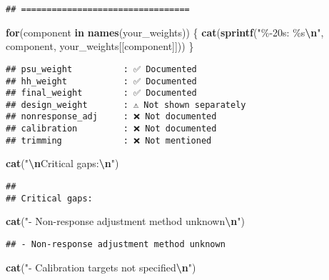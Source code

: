 \documentclass[
]{article}
\newenvironment{Shaded}{\begin{snugshade}}{\end{snugshade}}
\newcommand{\ControlFlowTok}[1]{\textcolor[rgb]{0.13,0.29,0.53}{\textbf{#1}}}
\newcommand{\FunctionTok}[1]{\textcolor[rgb]{0.13,0.29,0.53}{\textbf{#1}}}
\newcommand{\NormalTok}[1]{#1}
\newcommand{\SpecialCharTok}[1]{\textcolor[rgb]{0.81,0.36,0.00}{\textbf{#1}}}
\newcommand{\StringTok}[1]{\textcolor[rgb]{0.31,0.60,0.02}{#1}}
\begin{document}
\begin{verbatim}
## =================================
\end{verbatim}

\begin{Shaded}
\begin{Highlighting}[]
\ControlFlowTok{for}\NormalTok{(component }\ControlFlowTok{in} \FunctionTok{names}\NormalTok{(your\_weights)) \{}
  \FunctionTok{cat}\NormalTok{(}\FunctionTok{sprintf}\NormalTok{(}\StringTok{"\%{-}20s: \%s}\SpecialCharTok{\textbackslash{}n}\StringTok{"}\NormalTok{, component, your\_weights[[component]]))}
\NormalTok{\}}
\end{Highlighting}
\end{Shaded}

\begin{verbatim}
## psu_weight          : ✅ Documented
## hh_weight           : ✅ Documented
## final_weight        : ✅ Documented
## design_weight       : ⚠️ Not shown separately
## nonresponse_adj     : ❌ Not documented
## calibration         : ❌ Not documented
## trimming            : ❌ Not mentioned
\end{verbatim}

\begin{Shaded}
\begin{Highlighting}[]
\FunctionTok{cat}\NormalTok{(}\StringTok{"}\SpecialCharTok{\textbackslash{}n}\StringTok{Critical gaps:}\SpecialCharTok{\textbackslash{}n}\StringTok{"}\NormalTok{)}
\end{Highlighting}
\end{Shaded}

\begin{verbatim}
## 
## Critical gaps:
\end{verbatim}

\begin{Shaded}
\begin{Highlighting}[]
\FunctionTok{cat}\NormalTok{(}\StringTok{"{-} Non{-}response adjustment method unknown}\SpecialCharTok{\textbackslash{}n}\StringTok{"}\NormalTok{)}
\end{Highlighting}
\end{Shaded}

\begin{verbatim}
## - Non-response adjustment method unknown
\end{verbatim}

\begin{Shaded}
\begin{Highlighting}[]
\FunctionTok{cat}\NormalTok{(}\StringTok{"{-} Calibration targets not specified}\SpecialCharTok{\textbackslash{}n}\StringTok{"}\NormalTok{)}
\end{Highlighting}
\end{Shaded}
\end{document}
